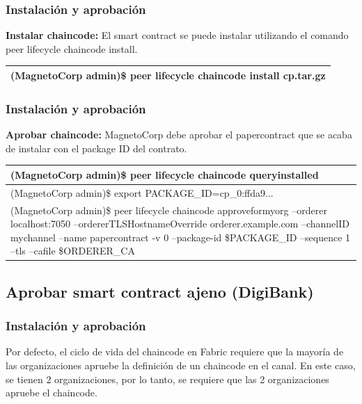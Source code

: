 \documentclass{beamer}
\begin{document}
	\begin{frame}
		\frametitle{Instalación y aprobación}
		\textbf{Instalar chaincode:} El smart contract se puede instalar utilizando el comando peer lifecycle chaincode install.\\
		\begin{center}
			\begin{tabulary}{\linewidth}{L}
				\hline
				(MagnetoCorp admin)\$ peer lifecycle chaincode install cp.tar.gz\\
				\hline
			\end{tabulary} 
		\end{center}
	\end{frame}
	
	\begin{frame}
		\frametitle{Instalación y aprobación}
		\textbf{Aprobar chaincode:} MagnetoCorp debe aprobar el papercontract que se acaba de instalar con el package ID del contrato.\\
		\begin{center}
			\begin{tabulary}{\linewidth}{L}
				\hline
				(MagnetoCorp admin)\$ peer lifecycle chaincode queryinstalled \\
				\hline
				(MagnetoCorp admin)\$ export PACKAGE\_ID=cp\_0:ffda9... \\
				\hline
				(MagnetoCorp admin)\$ peer lifecycle chaincode approveformyorg --orderer localhost:7050 --ordererTLSHostnameOverride orderer.example.com --channelID mychannel --name papercontract -v 0 --package-id \$PACKAGE\_ID --sequence 1 --tls --cafile \$ORDERER\_CA \\
				\hline
			\end{tabulary} 
		\end{center}
	\end{frame}
	
	\subsection{Aprobar smart contract ajeno (DigiBank)}
	
	\begin{frame}
		\frametitle{Instalación y aprobación}
		Por defecto, el ciclo de vida del chaincode en Fabric requiere que la mayoría de las organizaciones apruebe la definición de un chaincode en el canal. En este caso, se tienen 2 organizaciones, por lo tanto, se requiere que las 2 organizaciones apruebe el chaincode.
	\end{frame}
	
\end{document}
